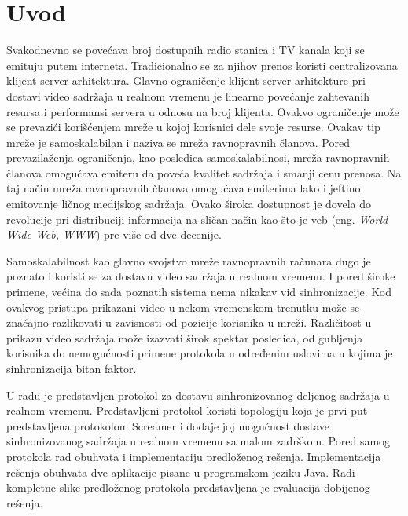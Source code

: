 \documentclass[12pt,oneside]{memoir}
\begin{document}
\frontmatter
\naslovna
\komisija
\apstrakt
\tableofcontents*

\mainmatter

\chapter{Uvod}
Svakodnevno se povećava broj dostupnih radio stanica i TV kanala koji se emituju putem interneta. Tradicionalno se za njihov prenos koristi centralizovana klijent-server arhitektura. Glavno ograničenje klijent-server arhitekture pri dostavi video sadržaja u realnom vremenu je linearno povećanje zahtevanih resursa i performansi servera u odnosu na broj klijenta. Ovakvo ograničenje može se prevazići korišćenjem mreže u kojoj korisnici dele svoje resurse. Ovakav tip mreže je samoskalabilan i naziva se mreža ravnopravnih članova. Pored prevazilaženja ograničenja, kao posledica samoskalabilnosi, mreža ravnopravnih članova omogućava emiteru da poveća kvalitet sadržaja i smanji cenu prenosa. Na taj način mreža ravnopravnih članova omogućava emiterima lako i jeftino emitovanje ličnog medijskog sadržaja. Ovako široka dostupnost je dovela do revolucije pri distribuciji informacija na sličan način kao što je veb (eng. \textit{World Wide Web, WWW}) pre više od dve decenije.

Samoskalabilnost kao glavno svojstvo mreže ravnopravnih računara dugo je poznato i koristi se za dostavu video sadržaja u realnom vremenu. I pored široke primene, većina do sada poznatih sistema nema nikakav vid sinhronizacije. Kod ovakvog pristupa prikazani video u nekom vremenskom trenutku može se značajno razlikovati u zavisnosti od pozicije korisnika u mreži. Različitost u prikazu video sadržaja može izazvati širok spektar posledica, od gubljenja korisnika do nemogućnosti primene protokola u određenim uslovima u kojima je sinhronizacija bitan faktor.

U radu je predstavljen protokol za dostavu sinhronizovanog deljenog sadržaja u realnom vremenu. Predstavljeni protokol koristi topologiju koja je prvi put predstavljena protokolom  Screamer i dodaje joj mogućnost dostave sinhronizovanog sadržaja u realnom vremenu sa malom zadrškom. Pored samog protokola rad obuhvata i implementaciju predloženog rešenja. Implementacija rešenja obuhvata dve aplikacije pisane u programskom jeziku Java. Radi kompletne slike predloženog protokola predstavljena je evaluacija dobijenog rešenja. 
  
\end{document}
